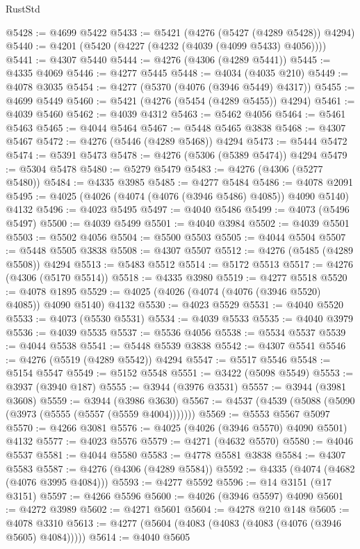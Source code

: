 \begin{lexlean}{RustStd}
\begin{coremodule}
@5428 := @4699 @5422
@5433 := @5421 (@4276 (@5427 (@4289 @5428)) @4294)
@5440 := @4201 (@5420 (@4227 (@4232 (@4039 (@4099 @5433) @4056))))
@5441 := @4307 @5440
@5444 := @4276 (@4306 (@4289 @5441))
@5445 := @4335 @4069
@5446 := @4277 @5445
@5448 := @4034 (@4035 @210)
@5449 := @4078 @3035
@5454 := @4277 (@5370 (@4076 (@3946 @5449) @4317))
@5455 := @4699 @5449
@5460 := @5421 (@4276 (@5454 (@4289 @5455)) @4294)
@5461 := @4039 @5460
@5462 := @4039 @4312
@5463 := @5462 @4056
@5464 := @5461 @5463
@5465 := @4044 @5464
@5467 := @5448 @5465 @3838
@5468 := @4307 @5467
@5472 := @4276 (@5446 (@4289 @5468)) @4294
@5473 := @5444 @5472
@5474 := @5391 @5473
@5478 := @4276 (@5306 (@5389 @5474)) @4294
@5479 := @5304 @5478
@5480 := @5279 @5479
@5483 := @4276 (@4306 (@5277 @5480))
@5484 := @4335 @3985
@5485 := @4277 @5484
@5486 := @4078 @2091
@5495 := @4025 (@4026 (@4074 (@4076 (@3946 @5486) @4085)) @4090 @5140) @4132
@5496 := @4023 @5495
@5497 := @4040 @5486
@5499 := @4073 (@5496 @5497)
@5500 := @4039 @5499
@5501 := @4040 @3984
@5502 := @4039 @5501
@5503 := @5502 @4056
@5504 := @5500 @5503
@5505 := @4044 @5504
@5507 := @5448 @5505 @3838
@5508 := @4307 @5507
@5512 := @4276 (@5485 (@4289 @5508)) @4294
@5513 := @5483 @5512
@5514 := @5172 @5513
@5517 := @4276 (@4306 (@5170 @5514))
@5518 := @4335 @3980
@5519 := @4277 @5518
@5520 := @4078 @1895
@5529 := @4025 (@4026 (@4074 (@4076 (@3946 @5520) @4085)) @4090 @5140) @4132
@5530 := @4023 @5529
@5531 := @4040 @5520
@5533 := @4073 (@5530 @5531)
@5534 := @4039 @5533
@5535 := @4040 @3979
@5536 := @4039 @5535
@5537 := @5536 @4056
@5538 := @5534 @5537
@5539 := @4044 @5538
@5541 := @5448 @5539 @3838
@5542 := @4307 @5541
@5546 := @4276 (@5519 (@4289 @5542)) @4294
@5547 := @5517 @5546
@5548 := @5154 @5547
@5549 := @5152 @5548
@5551 := @3422 (@5098 @5549)
@5553 := @3937 (@3940 @187)
@5555 := @3944 (@3976 @3531)
@5557 := @3944 (@3981 @3608)
@5559 := @3944 (@3986 @3630)
@5567 := @4537 (@4539 (@5088 (@5090 (@3973 (@5555 (@5557 (@5559 @4004)))))))
@5569 := @5553 @5567 @5097
@5570 := @4266 @3081
@5576 := @4025 (@4026 (@3946 @5570) @4090 @5501) @4132
@5577 := @4023 @5576
@5579 := @4271 (@4632 @5570)
@5580 := @4046 @5537
@5581 := @4044 @5580
@5583 := @4778 @5581 @3838
@5584 := @4307 @5583
@5587 := @4276 (@4306 (@4289 @5584))
@5592 := @4335 (@4074 (@4682 (@4076 @3995 @4084)))
@5593 := @4277 @5592
@5596 := @14 @3151 (@17 @3151)
@5597 := @4266 @5596
@5600 := @4026 (@3946 @5597) @4090
@5601 := @4272 @3989
@5602 := @4271 @5601
@5604 := @4278 @210 @148
@5605 := @4078 @3310
@5613 := @4277 (@5604 (@4083 (@4083 (@4083 (@4076 (@3946 @5605) @4084)))))
@5614 := @4040 @5605

\end{coremodule}
\end{lexlean}
